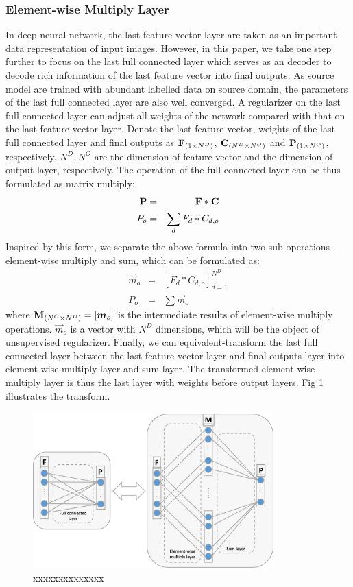 \documentclass[runningheads]{llncs}
\begin{document}
\subsubsection{Element-wise Multiply Layer}
\label{section:Element-wise Multiply Layer}
In deep neural network, the last feature vector layer are taken as an important data representation of input images. However, in this paper, we take one step further to focus on the last full connected layer which serves as an decoder to decode rich information of the last feature vector into final outputs. As source model are trained with abundant labelled data on source domain, the parameters of the last full connected layer are also well converged. A regularizer on the last full connected layer can adjust all weights of the network compared with that on the last feature vector layer. Denote the last feature vector, weights of the last full connected layer and final outputs as ${\bf F}_{(1\times N^{D})}$, ${\bf C}_{(N^{D}\times N^{O})}$ and ${\bf P}_{(1\times N^{O})}$, respectively. $ N^{D}, N^{O}$ are the dimension of feature vector and the dimension of output layer, respectively. The operation of the full connected layer can be thus formulated as matrix multiply:
\begin{eqnarray}
  {\bf P} &=& {\bf F}*{\bf C} \\
  P_{o} &=&  \sum_{d}{F_{d}*C_{d,o}}
\end{eqnarray}
Inspired by this form, we separate the above formula into two sub-operations -- element-wise multiply and sum, which can be formulated as:
\begin{eqnarray}
  \vec{m}_{o} &=& [F_{d} * C_{d,o}]^{N^{D}}_{d=1} \\
  P_{o} &=& \sum{\vec{m}_{o}}
\end{eqnarray}
where ${\bf M}_{(N^{O}\times N^{D})} = [\vec{m}_{o}]$ is the intermediate results of element-wise multiply operations. $\vec{m}_{o}$ is a vector with $N^{D}$ dimensions, which will be the object of unsupervised regularizer. Finally, we can equivalent-transform the last full connected layer between the last feature vector layer and final outputs layer into element-wise multiply layer and sum layer. The transformed element-wise multiply layer is thus the last layer with weights before output layers. Fig \ref{fig:elementwiselayer} illustrates the transform.

\begin{figure}
\centering
\includegraphics[height=6cm]{images/elementwiselayer.png}
\caption{xxxxxxxxxxxxxx}
\label{fig:elementwiselayer}
\end{figure}
\end{document}
